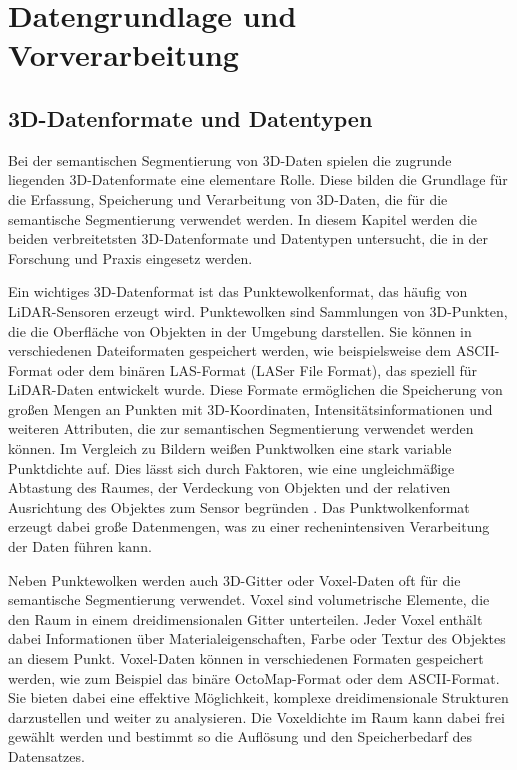 \chapter{Datengrundlage und Vorverarbeitung}

\section{3D-Datenformate und Datentypen}
Bei der semantischen Segmentierung von 3D-Daten spielen die zugrunde liegenden
3D-Datenformate eine elementare Rolle. Diese bilden die Grundlage für die
Erfassung, Speicherung und Verarbeitung von 3D-Daten, die für die semantische
Segmentierung verwendet werden. In diesem Kapitel werden die beiden
verbreitetsten 3D-Datenformate und Datentypen untersucht, die in der Forschung
und Praxis eingesetz werden.

Ein wichtiges 3D-Datenformat ist das Punktewolkenformat, das häufig von
LiDAR-Sensoren erzeugt wird. Punktewolken sind Sammlungen von 3D-Punkten, die
die Oberfläche von Objekten in der Umgebung darstellen. Sie können in
verschiedenen Dateiformaten gespeichert werden, wie beispielsweise dem
ASCII-Format oder dem binären LAS-Format (LASer File Format), das speziell für
LiDAR-Daten entwickelt wurde. Diese Formate ermöglichen die Speicherung von
großen Mengen an Punkten mit 3D-Koordinaten, Intensitätsinformationen und
weiteren Attributen, die zur semantischen Segmentierung verwendet werden
können. Im Vergleich zu Bildern weißen Punktwolken eine stark variable
Punktdichte auf. Dies lässt sich durch Faktoren, wie eine ungleichmäßige
Abtastung des Raumes, der Verdeckung von Objekten und der relativen Ausrichtung
des Objektes zum Sensor begründen \cite{8578570}. Das Punktwolkenformat erzeugt
dabei große Datenmengen, was zu einer rechenintensiven Verarbeitung der Daten
führen kann.

Neben Punktewolken werden auch 3D-Gitter oder Voxel-Daten oft für die
semantische Segmentierung verwendet. Voxel sind volumetrische Elemente, die den
Raum in einem dreidimensionalen Gitter unterteilen. Jeder Voxel enthält dabei
Informationen über Materialeigenschaften, Farbe oder Textur des Objektes an
diesem Punkt. Voxel-Daten können in verschiedenen Formaten gespeichert werden,
wie zum Beispiel das binäre OctoMap-Format oder dem ASCII-Format. Sie bieten
dabei eine effektive Möglichkeit, komplexe dreidimensionale Strukturen
darzustellen und weiter zu analysieren. Die Voxeldichte im Raum kann dabei frei
gewählt werden und bestimmt so die Auflösung und den Speicherbedarf des
Datensatzes.


